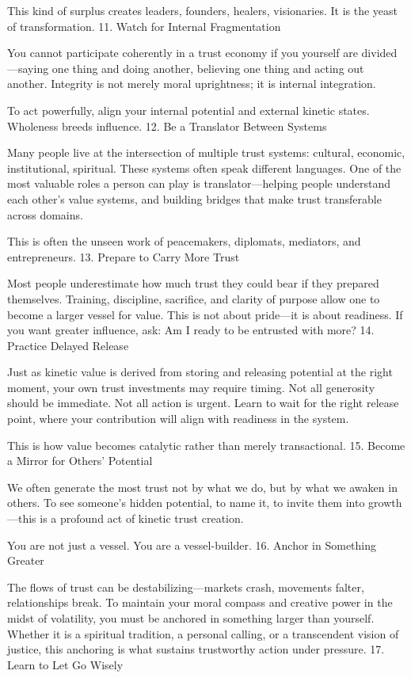 \documentclass[11pt,oneside]{book}
\begin{document}
This kind of surplus creates leaders, founders, healers, visionaries. It is the yeast of transformation.
11. Watch for Internal Fragmentation

You cannot participate coherently in a trust economy if you yourself are divided—saying one thing and doing another, believing one thing and acting out another. Integrity is not merely moral uprightness; it is internal integration.

To act powerfully, align your internal potential and external kinetic states. Wholeness breeds influence.
12. Be a Translator Between Systems

Many people live at the intersection of multiple trust systems: cultural, economic, institutional, spiritual. These systems often speak different languages. One of the most valuable roles a person can play is translator—helping people understand each other’s value systems, and building bridges that make trust transferable across domains.

This is often the unseen work of peacemakers, diplomats, mediators, and entrepreneurs.
13. Prepare to Carry More Trust

Most people underestimate how much trust they could bear if they prepared themselves. Training, discipline, sacrifice, and clarity of purpose allow one to become a larger vessel for value. This is not about pride—it is about readiness. If you want greater influence, ask: Am I ready to be entrusted with more?
14. Practice Delayed Release

Just as kinetic value is derived from storing and releasing potential at the right moment, your own trust investments may require timing. Not all generosity should be immediate. Not all action is urgent. Learn to wait for the right release point, where your contribution will align with readiness in the system.

This is how value becomes catalytic rather than merely transactional.
15. Become a Mirror for Others’ Potential

We often generate the most trust not by what we do, but by what we awaken in others. To see someone’s hidden potential, to name it, to invite them into growth—this is a profound act of kinetic trust creation.

You are not just a vessel. You are a vessel-builder.
16. Anchor in Something Greater

The flows of trust can be destabilizing—markets crash, movements falter, relationships break. To maintain your moral compass and creative power in the midst of volatility, you must be anchored in something larger than yourself. Whether it is a spiritual tradition, a personal calling, or a transcendent vision of justice, this anchoring is what sustains trustworthy action under pressure.
17. Learn to Let Go Wisely
\end{document}
